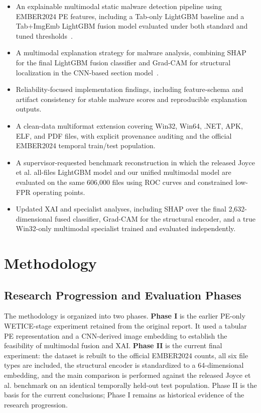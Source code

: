 \documentclass[conference]{IEEEtran}
\begin{document}
\begin{itemize}
\item
An explainable multimodal static malware detection pipeline using EMBER2024 PE features, including a Tab-only LightGBM baseline and a Tab+ImgEmb LightGBM fusion model evaluated under both standard and tuned thresholds~\cite{JMGPR2024}.
\item 
A multimodal explanation strategy for malware analysis, combining SHAP for the final LightGBM fusion classifier and Grad-CAM for structural localization in the CNN-based section model~\cite{SCDVPB2017,LL2017}.
\item 
Reliability-focused implementation findings, including feature-schema and artifact consistency for stable malware scores and reproducible explanation outputs.
\item
A clean-data multiformat extension covering Win32, Win64, .NET, APK, ELF, and PDF files, with explicit provenance auditing and the official EMBER2024 temporal train/test population.
\item
A supervisor-requested benchmark reconstruction in which the released Joyce et al. all-files LightGBM model and our unified multimodal model are evaluated on the same 606,000 files using ROC curves and constrained low-FPR operating points.
\item
Updated XAI and specialist analyses, including SHAP over the final 2,632-dimensional fused classifier, Grad-CAM for the structural encoder, and a true Win32-only multimodal specialist trained and evaluated independently.
\end{itemize}

\section{Methodology}
\label{section:methodology}

\subsection{Research Progression and Evaluation Phases}
The methodology is organized into two phases. \textbf{Phase I} is the earlier PE-only WETICE-stage experiment retained from the original report. It used a tabular PE representation and a CNN-derived image embedding to establish the feasibility of multimodal fusion and XAI. \textbf{Phase II} is the current final experiment: the dataset is rebuilt to the official EMBER2024 counts, all six file types are included, the structural encoder is standardized to a 64-dimensional embedding, and the main comparison is performed against the released Joyce et al. benchmark on an identical temporally held-out test population. Phase II is the basis for the current conclusions; Phase I remains as historical evidence of the research progression.
\end{document}
